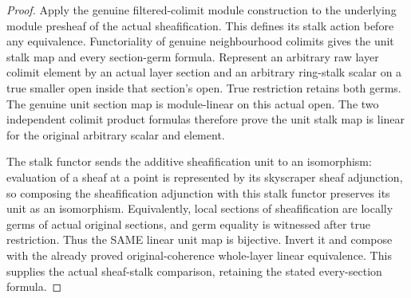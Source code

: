 \begin{proof}
Apply the genuine filtered-colimit module construction to the underlying
module presheaf of the actual sheafification. This defines its stalk
action before any equivalence. Functoriality of genuine neighbourhood
colimits gives the unit stalk map and every section-germ formula.
Represent an arbitrary raw layer colimit element by an actual layer
section and an arbitrary ring-stalk scalar on a true smaller open inside
that section's open. True restriction retains both germs. The genuine
unit section map is module-linear on this actual open. The two independent
colimit product formulas therefore prove the unit stalk map is linear
for the original arbitrary scalar and element.

The stalk functor sends the additive sheafification unit to an isomorphism:
evaluation of a sheaf at a point is represented by its skyscraper sheaf
adjunction, so composing the sheafification adjunction with this stalk
functor preserves its unit as an isomorphism. Equivalently, local sections
of sheafification are locally germs of actual original sections, and
germ equality is witnessed after true restriction. Thus the SAME linear
unit map is bijective. Invert it and compose with the already proved
original-coherence whole-layer linear equivalence. This supplies the
actual sheaf-stalk comparison, retaining the stated every-section formula.
\end{proof}

